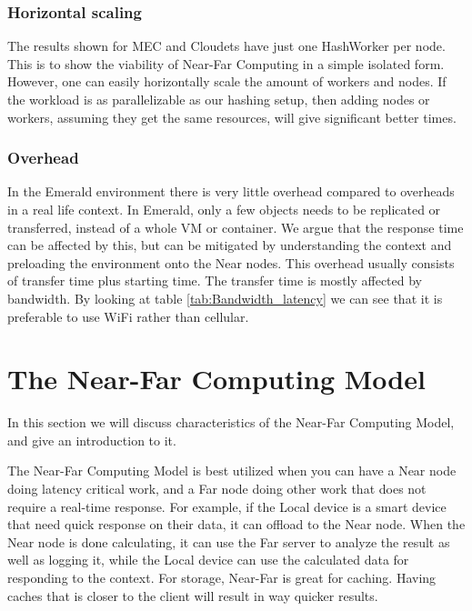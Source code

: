 \subsubsection{Horizontal scaling}
The results shown for MEC and Cloudets have just one HashWorker per node. This is to show the viability of Near-Far Computing in a simple isolated form. However, one can easily horizontally scale the amount of workers and nodes. If the workload is as parallelizable as our hashing setup, then adding nodes or workers, assuming they get the same resources, will give significant better times.

\subsubsection{Overhead}
In the Emerald environment there is very little overhead compared to overheads in a real life context. In Emerald, only a few objects needs to be replicated or transferred, instead of a whole VM or container. We argue that the response time can be affected by this, but can be mitigated by understanding the context and preloading the environment onto the Near nodes. This overhead usually consists of transfer time plus starting time. The transfer time is mostly affected by bandwidth. By looking at table \ref{tab:Bandwidth_latency} we can see that it is preferable to use WiFi rather than cellular. 








\section{The Near-Far Computing Model}
In this section we will discuss characteristics of the Near-Far Computing Model, and give an introduction to it. 

The Near-Far Computing Model is best utilized when you can have a Near node doing latency critical work, and a Far node doing other work that does not require a real-time response. For example, if the Local device is a smart device that need quick response on their data, it can offload to the Near node. When the Near node is done calculating, it can use the Far server to analyze the result as well as logging it, while the Local device can use the calculated data for responding to the context. For storage, Near-Far is great for caching. Having caches that is closer to the client will result in way quicker results.


